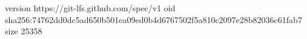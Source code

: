 version https://git-lfs.github.com/spec/v1
oid sha256:74762dd0dc5ad650b501ea09ed0b4d6767502f5a810c2097e28b82036c61fab7
size 25358
